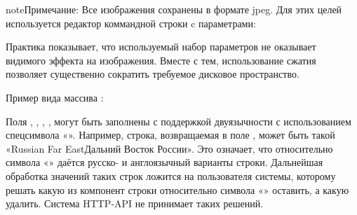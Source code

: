 \documentclass[letterpaper,10pt,russian]{sphinxmanual}
\begin{document}
\begin{sphinxadmonition}{note}{Примечание:}
Все изображения сохранены в формате jpeg. Для этих целей используется редактор коммандной строки
 c параметрами:

\begin{sphinxVerbatim}[commandchars=\\\{\}]
  
 
\end{sphinxVerbatim}

Практика показывает, что используемый набор параметров не оказывает видимого эффекта на изображения.
Вместе с тем, использование сжатия позволяет существенно сократить требуемое
дисковое пространство.
\end{sphinxadmonition}

Пример вида массива :

\begin{sphinxVerbatim}[commandchars=\\\{\}]
\PYG{p}{[}
\PYG{p}{]}
\end{sphinxVerbatim}
\label{\detokenize{http_api:field-reference-label}}
Поля , , , ,  могут быть заполнены с поддержкой двуязычности с использованием спецсимвола «\textbar{}». Например, строка, возвращаемая в поле , может быть такой «Russian Far East\textbar{}Дальний Восток России». Это означает, что относительно символа «\textbar{}» даётся русско- и англоязычный варианты строки. Дальнейшая обработка значений таких строк ложится на пользователя системы, которому решать
какую из компонент строки относительно символа «\textbar{}» оставить, а какую \textendash{} удалить.
Система HTTP-API не принимает таких решений.
\end{document}

